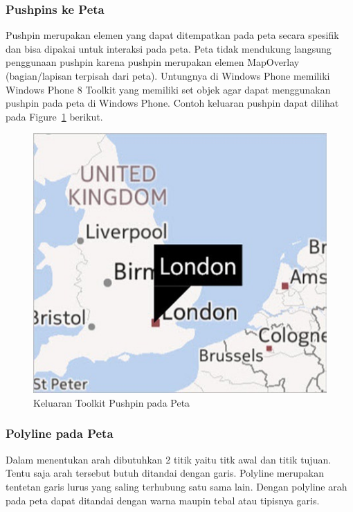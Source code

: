 \subsubsection{Pushpins ke Peta}
\label{subsubsec:Pushpins ke Peta}
\hspace{0.5cm} Pushpin merupakan elemen yang dapat ditempatkan pada peta secara spesifik dan bisa dipakai untuk interaksi pada peta. Peta tidak mendukung langsung penggunaan pushpin karena pushpin merupakan elemen MapOverlay (bagian/lapisan terpisah dari peta). Untungnya di Windows Phone memiliki Windows Phone 8 Toolkit yang memiliki set objek agar dapat menggunakan pushpin pada peta di Windows Phone. Contoh keluaran pushpin dapat dilihat pada Figure~\ref{fig:toolkit_pushpin} berikut.

\begin{figure}[!h]
	\centering
		\includegraphics[scale=0.5]{Gambar/toolkit_pushpin}
	\caption{Keluaran Toolkit Pushpin pada Peta \cite{Manning}}
	\label{fig:toolkit_pushpin}
\end{figure}

\subsubsection{Polyline pada Peta}
\label{subsubsec:Polyline pada Peta}
\hspace{0.5cm} Dalam menentukan arah dibutuhkan 2 titik yaitu titk awal dan titik tujuan. Tentu saja arah tersebut butuh ditandai dengan garis. Polyline merupakan tentetan garis lurus yang saling terhubung satu sama lain. Dengan polyline arah pada peta dapat ditandai dengan warna maupin tebal atau tipisnya garis. 

